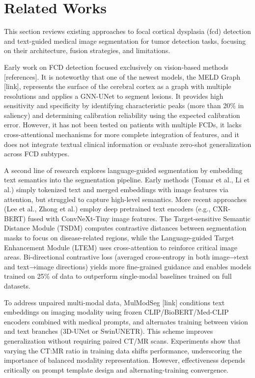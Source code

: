 \documentclass[FCD_GNN.tex]{subfiles}
\begin{document}
\chapter{Related Works}

This section reviews existing approaches to focal cortical dysplasia (\acs{fcd}) detection and text-guided medical image segmentation for tumor detection 
tasks, focusing on their architecture, fusion strategies, and limitations.

Early work on FCD detection focused exclusively on vision-based methods [references]. It is noteworthy that one of the newest models, the MELD Graph 
[link], represents the surface of the cerebral cortex as a graph with multiple resolutions and applies a GNN-UNet to segment lesions. It provides high 
sensitivity and specificity by identifying characteristic peaks (more than 20\% in saliency) and determining calibration reliability using the expected 
calibration error. However, it has not been tested on patients with multiple FCDs, it lacks cross-attentional mechanisms for more complete integration of 
features, and it does not integrate textual clinical information or evaluate zero-shot generalization across FCD subtypes.

A second line of research explores language-guided segmentation by embedding text semantics into the segmentation pipeline. Early methods 
(Tomar et al., Li et al.) simply tokenized text and merged embeddings with image features via attention, but struggled to capture high-level semantics. 
More recent approaches (Lee et al., Zhong et al.) employ deep pretrained text encoders (e.g., CXR-BERT) fused with ConvNeXt-Tiny image features. The 
Target-sensitive Semantic Distance Module (TSDM) computes contrastive distances between segmentation masks to focus on disease-related regions, while the
 Language-guided Target Enhancement Module (LTEM) uses cross-attention to reinforce critical image areas. Bi-directional contrastive loss (averaged 
 cross-entropy in both image→text and text→image directions) yields more fine-grained guidance and enables models trained on 25\% of data to outperform 
 single-modal baselines trained on full datasets.

To address unpaired multi-modal data, MulModSeg [link] conditions text embeddings on imaging modality using frozen CLIP/BioBERT/Med-CLIP encoders 
combined with medical prompts, and alternates training between vision and text branches (3D-UNet or SwinUNETR). This scheme improves generalization 
without requiring paired CT/MR scans. Experiments show that varying the CT:MR ratio in training data shifts performance, underscoring the importance 
of balanced modality representation. However, effectiveness depends critically on prompt template design and alternating-training convergence.
\end{document}
